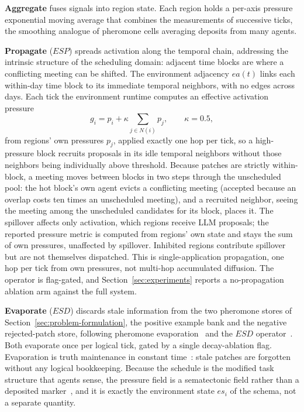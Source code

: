 \textbf{Aggregate} fuses signals into region state. Each region holds a per-axis pressure exponential moving average that combines the measurements of successive ticks, the smoothing analogue of pheromone cells averaging deposits from many agents.

\textbf{Propagate} ($ESP$) spreads activation along the temporal chain, addressing the intrinsic structure of the scheduling domain: adjacent time blocks are where a conflicting meeting can be shifted. The environment adjacency $ea(t)$ links each within-day time block to its immediate temporal neighbors, with no edges across days. Each tick the environment runtime computes an effective activation pressure
\[
g_i = p_i + \kappa \sum_{j \in N(i)} p_j, \qquad \kappa = 0.5,
\]
from regions' own pressures $p_j$, applied exactly one hop per tick, so a high-pressure block recruits proposals in its idle temporal neighbors without those neighbors being individually above threshold. Because patches are strictly within-block, a meeting moves between blocks in two steps through the unscheduled pool: the hot block's own agent evicts a conflicting meeting (accepted because an overlap costs ten times an unscheduled meeting), and a recruited neighbor, seeing the meeting among the unscheduled candidates for its block, places it. The spillover affects only activation, which regions receive LLM proposals; the reported pressure metric is computed from regions' own state and stays the sum of own pressures, unaffected by spillover. Inhibited regions contribute spillover but are not themselves dispatched. This is single-application propagation, one hop per tick from own pressures, not multi-hop accumulated diffusion. The operator is flag-gated, and Section~\ref{sec:experiments} reports a no-propagation ablation arm against the full system.

\textbf{Evaporate} ($ESD$) discards stale information from the two pheromone stores of Section~\ref{sec:problem-formulation}, the positive example bank and the negative rejected-patch store, following pheromone evaporation~\cite{dorigo1996ant} and the $ESD$ operator~\cite{parunak2011mean}. Both evaporate once per logical tick, gated by a single decay-ablation flag. Evaporation is truth maintenance in constant time~\cite{parunak2011mean}: stale patches are forgotten without any logical bookkeeping. Because the schedule is the modified task structure that agents sense, the pressure field is a sematectonic field rather than a deposited marker~\cite{parunak2006survey}, and it is exactly the environment state $es_i$ of the schema, not a separate quantity.

